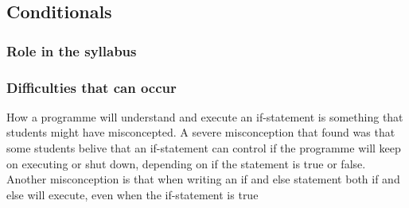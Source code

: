 \subsection{Conditionals}

\subsubsection{Role in the syllabus}

\subsubsection{Difficulties that can occur}

How a programme will understand and execute an if-statement is something that students might have misconcepted. A severe misconception that \textcite{Plass2015Variables} found was that some students belive that an if-statement can control if the programme will keep on executing or shut down, depending on if the statement is true or false. Another misconception is that when writing an if and else statement both if and else will execute, even when the if-statement is true \parencite{MisconceptionsSurvey2017}
